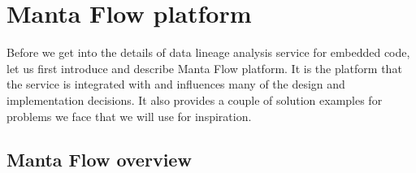 \chapter{Manta Flow platform}

Before we get into the details of data lineage analysis service for embedded code, let us first introduce and describe Manta Flow platform. It is the platform that the service is integrated with and influences many of the design and implementation decisions. It also provides a couple of solution examples for problems we face that we will use for inspiration.

\section{Manta Flow overview}

